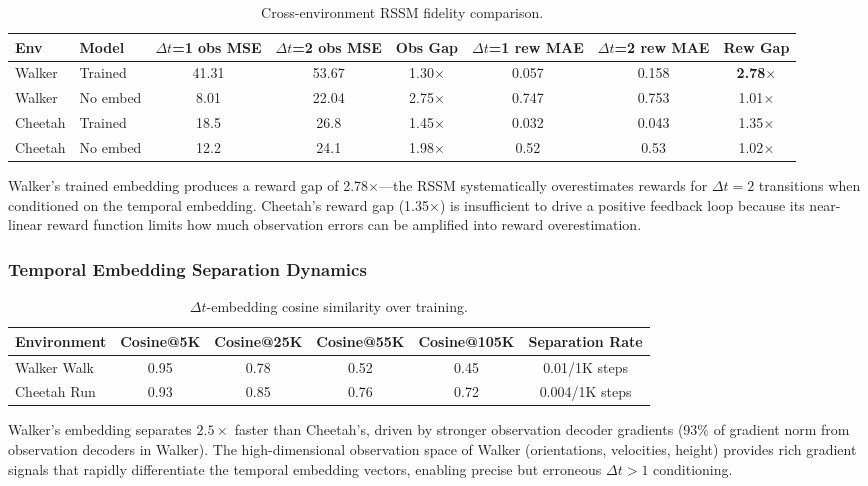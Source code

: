 \documentclass[letterpaper]{article}
\begin{document}
\begin{table}[h]
\centering
\caption{Cross-environment RSSM fidelity comparison.}
\label{tab:rssm}
\begin{tabular}{llcccccc}
\toprule
Env & Model & $\Delta t$=1 obs MSE & $\Delta t$=2 obs MSE & Obs Gap & $\Delta t$=1 rew MAE & $\Delta t$=2 rew MAE & Rew Gap \\
\midrule
Walker & Trained & 41.31 & 53.67 & 1.30$\times$ & 0.057 & 0.158 & \textbf{2.78$\times$} \\
Walker & No embed & 8.01 & 22.04 & 2.75$\times$ & 0.747 & 0.753 & 1.01$\times$ \\
Cheetah & Trained & 18.5 & 26.8 & 1.45$\times$ & 0.032 & 0.043 & 1.35$\times$ \\
Cheetah & No embed & 12.2 & 24.1 & 1.98$\times$ & 0.52 & 0.53 & 1.02$\times$ \\
\bottomrule
\end{tabular}
\end{table}

Walker's trained embedding produces a reward gap of 2.78$\times$---the RSSM systematically overestimates rewards for $\Delta t=2$ transitions when conditioned on the temporal embedding. Cheetah's reward gap (1.35$\times$) is insufficient to drive a positive feedback loop because its near-linear reward function limits how much observation errors can be amplified into reward overestimation.

\subsubsection{Temporal Embedding Separation Dynamics}

\begin{table}[h]
\centering
\caption{$\Delta t$-embedding cosine similarity over training.}
\label{tab:cosine}
\begin{tabular}{lccccc}
\toprule
Environment & Cosine@5K & Cosine@25K & Cosine@55K & Cosine@105K & Separation Rate \\
\midrule
Walker Walk & 0.95 & 0.78 & 0.52 & 0.45 & 0.01/1K steps \\
Cheetah Run & 0.93 & 0.85 & 0.76 & 0.72 & 0.004/1K steps \\
\bottomrule
\end{tabular}
\end{table}

Walker's embedding separates $2.5\times$ faster than Cheetah's, driven by stronger observation decoder gradients (93\% of gradient norm from observation decoders in Walker). The high-dimensional observation space of Walker (orientations, velocities, height) provides rich gradient signals that rapidly differentiate the temporal embedding vectors, enabling precise but erroneous $\Delta t>1$ conditioning.
\end{document}
